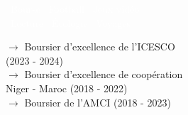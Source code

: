 \documentclass[theme]{cv_einstein}
\begin{document}
\begin{paracol}{2}
            
        
       
        
\begin{leftcolumn} \noindent \small
    \textcolor{white}{\: \faLineChart\ Bourse }
    \textcolor{white}{\:\faSoccerBallO \ Football} \textcolor{white}{\: \faGamepad\ Jeux vidéo}  \\
    \textcolor{white}{\: \faBook\ Lecture}
    \textcolor{white}{\: \faLeaf\ Écologie}
    \textcolor{white}{\: \faPlane\ Voyages }
\end{leftcolumn}
        \begin{leftcolumn}\noindent \footnotesize
        {\color{white}
\normalsize 
 $\rightarrow$ Boursier d'excellence de l'ICESCO \\ (2023 - 2024) \\ [0.5em]
 $\rightarrow$  Boursier d'excellence de coopération \\ \;\;\;\; Niger - Maroc  (2018 - 2022) \\ [0.5em]
 $\rightarrow$ Boursier de l'AMCI (2018 - 2023)

}
\end{leftcolumn}
\end{paracol}
\end{document}
